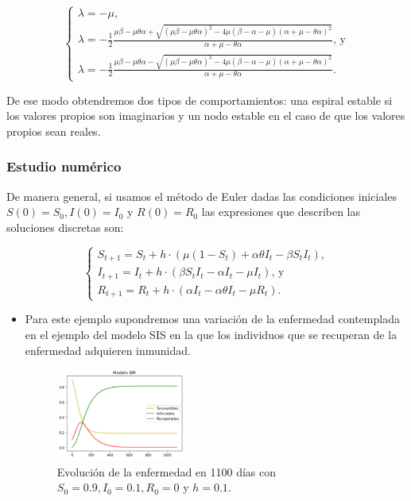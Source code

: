 $$\left\{\begin{array}{l}
\lambda=-\mu,\\
\lambda=-\frac{1}{2}\frac{\mu\beta-\mu\theta\alpha+\sqrt{(\mu\beta-\mu\theta\alpha)^2-4\mu(\beta-\alpha-\mu)(\alpha+\mu-\theta\alpha)^2}}{\alpha+\mu-\theta\alpha} \text{, y}\\
\lambda=-\frac{1}{2}\frac{\mu\beta-\mu\theta\alpha-\sqrt{(\mu\beta-\mu\theta\alpha)^2-4\mu(\beta-\alpha-\mu)(\alpha+\mu-\theta\alpha)^2}}{\alpha+\mu-\theta\alpha}.
\end{array}\right.$$

De ese modo obtendremos dos tipos de comportamientos: una espiral estable si los valores propios son imaginarios y un nodo estable en el caso de que los valores propios sean reales.

\subsubsection{Estudio numérico}

De manera general, si usamos el método de Euler dadas las condiciones iniciales $S(0)=S_0,I(0)=I_0$ y $R(0)=R_0$ las expresiones que describen las soluciones discretas son:

$$\left\{\begin{array}{l}
S_{t+1} = S_t + h\cdot(\mu(1 - S_t) + \alpha\theta I_t - \beta S_t I_t), \\
I_{t+1} = I_t + h\cdot(\beta S_t I_t - \alpha I_t - \mu I_t)\text{, y} \\
R_{t+1} = R_t + h\cdot(\alpha I_t - \alpha\theta I_t - \mu R_t).
\end{array}\right.$$

\begin{itemize}
    \item Para este ejemplo supondremos una variación de la enfermedad contemplada en el ejemplo del modelo SIS en la que los individuos que se recuperan de la enfermedad adquieren inmunidad.
    
    \begin{figure}[h]
      \centering
        \includegraphics[width=0.4\textwidth]{Imagenes/ex1SIR.PNG}
      \caption{\centering Evolución de la enfermedad en 1100 días con $S_0=0.9,I_0=0.1,R_0=0$ y $h=0.1$.}
      \label{fig:Ejemplo 2 - SIR}
    \end{figure}
\end{itemize}

